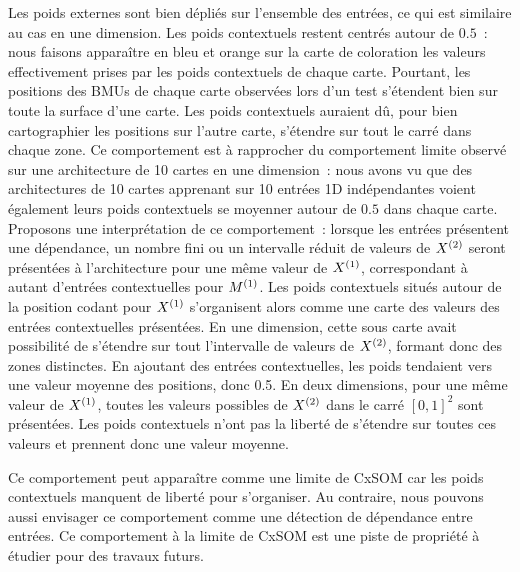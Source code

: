 \documentclass[../main]{subfiles}
\begin{document}
Les poids externes sont bien dépliés sur l'ensemble des entrées, ce qui est similaire au cas en une dimension.
Les poids contextuels restent centrés autour de $0.5$~: nous faisons apparaître en bleu et orange sur la carte de coloration les valeurs effectivement prises par les poids contextuels de chaque carte. 
Pourtant, les positions des BMUs de chaque carte observées lors d'un test s'étendent bien sur toute la surface d'une carte. Les poids contextuels auraient dû, pour bien cartographier les positions sur l'autre carte, s'étendre sur tout le carré dans chaque zone.
Ce comportement est à rapprocher du comportement limite observé sur une architecture de 10 cartes en une dimension~: nous avons vu que des architectures de 10 cartes apprenant sur 10 entrées 1D indépendantes voient également leurs poids contextuels se moyenner autour de $0.5$ dans chaque carte.
Proposons une interprétation de ce comportement~: lorsque les entrées présentent une  dépendance, un nombre fini ou un intervalle réduit de valeurs de $X^{({2})}$ seront présentées à l'architecture pour une même valeur de $X^{({1})}$, correspondant à autant d'entrées contextuelles pour $M^{({1})}$. Les poids contextuels situés autour de la position codant pour $X^{({1})}$ s'organisent alors comme une carte des valeurs des entrées contextuelles présentées. En une dimension, cette sous carte avait possibilité de s'étendre sur tout l'intervalle de valeurs de $X^{({2})}$, formant donc des zones distinctes. En ajoutant des entrées contextuelles, les poids tendaient vers une valeur moyenne des positions, donc 0.5.
En deux dimensions, pour une même valeur de $X^{({1})}$, toutes les valeurs possibles de $X^{({2})}$ dans le carré $[0,1]^2$ sont présentées. Les poids contextuels n'ont pas la liberté de s'étendre sur toutes ces valeurs et prennent donc une valeur moyenne.

Ce comportement peut apparaître comme une limite de CxSOM car les poids contextuels manquent de liberté pour s'organiser.
Au contraire, nous pouvons aussi envisager ce comportement comme une détection de dépendance entre entrées.
Ce comportement à la limite de CxSOM est une piste de propriété à étudier pour des travaux futurs.
\end{document}
